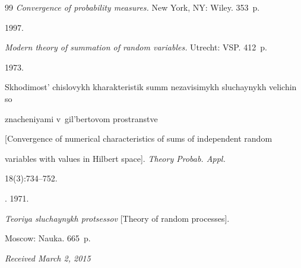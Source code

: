 {{\begin{thebibliography}{99}
\textit{Convergence of probability measures.} New York, NY: Wiley. 353~p.







 1997.


\textit{Modern theory of summation of random variables.} Utrecht: VSP. 412~p.







 1973.


Skhodimost' chislovykh kharakteristik summ nezavisimykh sluchaynykh velichin so


znacheniyami v~gil'bertovom prostranstve


[Convergence of numerical characteristics of sums of independent random


variables with values in Hilbert space]. \textit{Theory Probab. Appl.}


18(3):734--752.







. 1971.


\textit{Teoriya sluchaynykh protsessov} [Theory of random processes].


Moscow: Nauka. 665~p.


\end{thebibliography}


} }








\vspace*{-7pt}





\hfill{\small\textit{Received March 2, 2015}}





\vspace*{-16pt}





\Contrl





\vspace*{-5pt}





